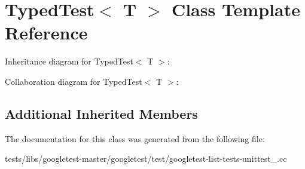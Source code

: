 \hypertarget{classTypedTest}{}\section{Typed\+Test$<$ T $>$ Class Template Reference}
\label{classTypedTest}


Inheritance diagram for Typed\+Test$<$ T $>$\+:


Collaboration diagram for Typed\+Test$<$ T $>$\+:
\subsection*{Additional Inherited Members}


The documentation for this class was generated from the following file\+:\begin{DoxyCompactItemize}
\item 
tests/libs/googletest-\/master/googletest/test/googletest-\/list-\/tests-\/unittest\+\_\+.\+cc\end{DoxyCompactItemize}
